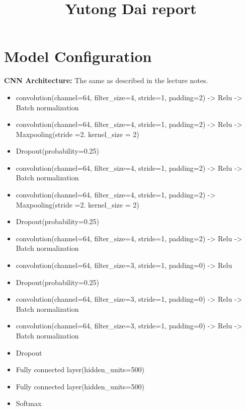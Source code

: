\documentclass[11pt]{article}
\title{Yutong Dai report}
\providecommand{\tightlist}{%
      \setlength{\itemsep}{0pt}\setlength{\parskip}{0pt}}
\begin{document}
    
    
    \maketitle
    
    

    
    \hypertarget{model-configuration}{%
\section{Model Configuration}\label{model-configuration}}

\textbf{CNN Architecture:} The same as described in the lecture notes.

\begin{itemize}
\tightlist
\item
  convolution(channel=64, filter\_size=4, stride=1, padding=2)
  -\textgreater{} Relu -\textgreater{} Batch normalization
\item
  convolution(channel=64, filter\_size=4, stride=1, padding=2)
  -\textgreater{} Relu -\textgreater{} Maxpooling(stride =2.
  kernel\_size = 2)
\item
  Dropout(probability=0.25)
\item
  convolution(channel=64, filter\_size=4, stride=1, padding=2)
  -\textgreater{} Relu -\textgreater{} Batch normalization
\item
  convolution(channel=64, filter\_size=4, stride=1, padding=2)
  -\textgreater{} Maxpooling(stride =2. kernel\_size = 2)
\item
  Dropout(probability=0.25)
\item
  convolution(channel=64, filter\_size=4, stride=1, padding=2)
  -\textgreater{} Relu -\textgreater{} Batch normalization
\item
  convolution(channel=64, filter\_size=3, stride=1, padding=0)
  -\textgreater{} Relu
\item
  Dropout(probability=0.25)
\item
  convolution(channel=64, filter\_size=3, stride=1, padding=0)
  -\textgreater{} Relu -\textgreater{} Batch normalization
\item
  convolution(channel=64, filter\_size=3, stride=1, padding=0)
  -\textgreater{} Relu -\textgreater{} Batch normalization
\item
  Dropout
\item
  Fully connected layer(hidden\_units=500)
\item
  Fully connected layer(hidden\_units=500)
\item
  Softmax
\end{itemize}
\end{document}
